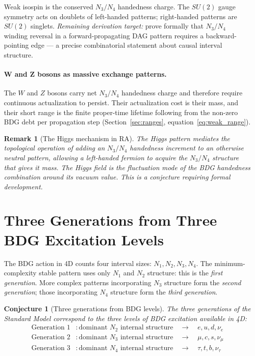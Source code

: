 \documentclass[11pt,a4paper]{article}
\newtheorem{conjecture}[theorem]{Conjecture}
\newtheorem{remark}[theorem]{Remark}
\begin{document}
Weak isospin is the conserved $N_3/N_4$ handedness charge. The $SU(2)$
gauge symmetry acts on doublets of left-handed patterns; right-handed patterns
are $SU(2)$ singlets. \emph{Remaining derivation target:} prove formally that
$N_3/N_4$ winding reversal in a forward-propagating DAG pattern requires a
backward-pointing edge --- a precise combinatorial statement about causal
interval structure.

\paragraph{W and Z bosons as massive exchange patterns.}
The $W$ and $Z$ bosons carry net $N_3/N_4$ handedness charge and therefore
require continuous actualization to persist. Their actualization cost is their
mass, and their short range is the finite proper-time lifetime following from
the non-zero BDG debt per propagation step (Section~\ref{sec:ranges},
equation~\eqref{eq:weak_range}).

\begin{remark}[The Higgs mechanism in RA]
The Higgs pattern mediates the topological operation of adding an $N_3/N_4$
handedness increment to an otherwise neutral pattern, allowing a left-handed
fermion to acquire the $N_3/N_4$ structure that gives it mass. The Higgs
field is the fluctuation mode of the BDG handedness combination around its
vacuum value. This is a conjecture requiring formal development.
\end{remark}

\section{Three Generations from Three BDG Excitation Levels}
\label{sec:generations}

The BDG action in 4D counts four interval sizes: $N_1, N_2, N_3, N_4$.
The minimum-complexity stable pattern uses only $N_1$ and $N_2$ structure:
this is the \emph{first generation}. More complex patterns incorporating
$N_3$ structure form the \emph{second generation}; those incorporating $N_4$
structure form the \emph{third generation}.

\begin{conjecture}[Three generations from BDG levels]
The three generations of the Standard Model correspond to the three levels
of BDG excitation available in 4D:
\begin{align}
  \text{Generation 1} &: \text{dominant }N_2\text{ internal structure}
  \quad\to\quad e, u, d, \nu_e\\
  \text{Generation 2} &: \text{dominant }N_3\text{ internal structure}
  \quad\to\quad \mu, c, s, \nu_\mu\\
  \text{Generation 3} &: \text{dominant }N_4\text{ internal structure}
  \quad\to\quad \tau, t, b, \nu_\tau
\end{align}
\end{conjecture}
\end{document}
